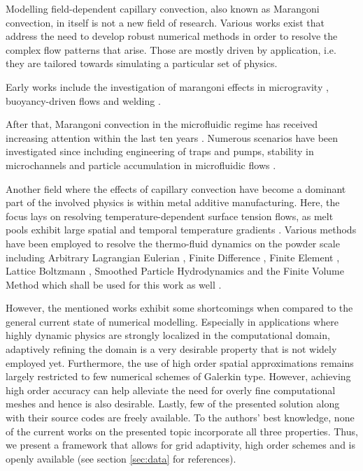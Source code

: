 \documentclass[conference,final]{IEEEtran}
\begin{document}
Modelling field-dependent capillary convection, also known as Marangoni convection, in itself is not a new field of research.
Various works exist that address the need to develop robust numerical methods in order to resolve the complex flow patterns that arise. Those are mostly driven by application, i.e. they are tailored towards simulating a particular set of physics.

Early works include the investigation of marangoni effects in microgravity \cite{chunExperimentsTransitionSteady1979,chunMicrogravitySimulationMarangoni1978}, buoyancy-driven flows \cite{villersCoupledBuoyancyMarangoni1992} and welding \cite{limmaneevichitrExperimentsSimulateEffect2000,limmaneevichitrVisualizationMarangoniConvection2000}.

After that, Marangoni convection in the microfluidic regime has received increasing attention within the last ten years \cite{karbalaeiThermocapillarityMicrofluidicsReview2016}. Numerous scenarios have been investigated since including engineering of traps and pumps, stability in microchannels and particle accumulation in microfluidic flows \cite{panInstabilityMarangoniToroidal2011,basuVirtualMicrofluidicTraps2008,orlishausenParticleAccumulationDepletion2017}.

Another field where the effects of capillary convection have become a dominant part of the involved physics is within metal additive manufacturing. Here, the focus lays on resolving temperature-dependent surface tension flows, as melt pools exhibit large spatial and temporal temperature gradients \cite{debroyAdditiveManufacturingMetallic2018}. Various methods have been employed to resolve the thermo-fluid dynamics on the powder scale including Arbitrary Lagrangian Eulerian \cite{khairallahMesoscopicSimulationModel2014,martinDynamicsPoreFormation2019}, Finite Difference \cite{gusarovModelRadiationHeat2009}, Finite Element \cite{zhangMultiscaleMultiphysicsModeling2018,caoNovelHighefficientFinite2021}, Lattice Boltzmann \cite{krzyzanowskiMultiphysicsSimulationApproach2021}, Smoothed Particle Hydrodynamics \cite{wimmerExperimentalNumericalInvestigations2021} and the Finite Volume Method which shall be used for this work as well \cite{leeMesoscopicSimulationHeat2015,gurtlerSimulationLaserBeam2013,ottoMultiphysicalSimulationLaser2012}.

However, the mentioned works exhibit some shortcomings when compared to the general current state of numerical modelling. Especially in applications where highly dynamic physics are strongly localized in the computational domain, adaptively refining the domain is a very desirable property that is not widely employed yet. Furthermore, the use of high order spatial approximations remains largely restricted to few numerical schemes of Galerkin type. However, achieving high order accuracy can help alleviate the need for overly fine computational meshes and hence is also desirable. Lastly, few of the presented solution along with their source codes are freely available. To the authors' best knowledge, none of the current works on the presented topic incorporate all three properties. Thus, we present a framework that allows for grid adaptivity, high order schemes and is openly available (see section \ref{sec:data} for references).
\end{document}
